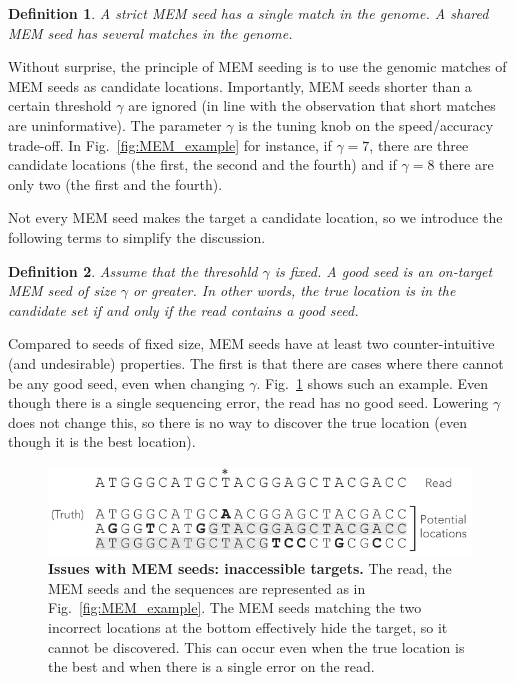 \documentclass{article}
\newtheorem{definition}{Definition}
\begin{document}
\begin{definition}
A \emph{strict} MEM seed has a single match in the genome.
A \emph{shared} MEM seed has several matches in the genome.
\end{definition}

Without surprise, the principle of MEM seeding is to use the genomic
matches of MEM seeds as candidate locations. Importantly, MEM seeds
shorter than a certain threshold $\gamma$ are ignored (in line with the
observation that short matches are uninformative). The parameter $\gamma$
is the tuning knob on the speed/accuracy trade-off. In
Fig.~\ref{fig:MEM_example} for instance, if $\gamma = 7$, there are three
candidate locations (the first, the second and the fourth) and if $\gamma
= 8$ there are only two (the first and the fourth).

Not every MEM seed makes the target a candidate location, so we introduce
the following terms to simplify the discussion.

\begin{definition}
Assume that the thresohld $\gamma$ is fixed. A \emph{good} seed is an
on-target MEM seed of size $\gamma$ or greater. In other words, the true
location is in the candidate set if and only if the read contains a
good seed.
\end{definition}

Compared to seeds of fixed size, MEM seeds have at least two
counter-intuitive (and undesirable) properties. The first is that there
are cases where there cannot be any good seed, even when changing
$\gamma$. Fig.~\ref{fig:full_masking_example} shows such an example. Even
though there is a single sequencing error, the read has no good seed.
Lowering $\gamma$ does not change this, so there is no way to discover the
true location (even though it is the best location).

\begin{figure}[h]
\centering
\includegraphics[scale=1]{full_masking_example.pdf}
\caption{\textbf{Issues with MEM seeds: inaccessible targets.}
The read, the MEM seeds and the sequences are represented as in
Fig.~\ref{fig:MEM_example}. The MEM seeds matching the two incorrect
locations at the bottom effectively hide the target, so it cannot
be discovered. This can occur even when the true location is the
best and when there is a single error on the read.}
\label{fig:full_masking_example}
\end{figure}
\end{document}
